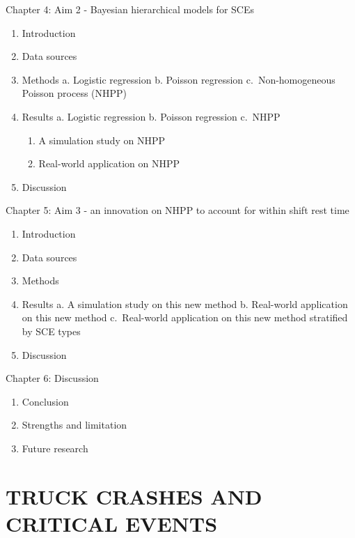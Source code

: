 \documentclass[12pt]{book}
\numberwithin{equation}{chapter}
\providecommand{\tightlist}{%
  \setlength{\itemsep}{0pt}\setlength{\parskip}{0pt}}
\begin{document}
Chapter 4: Aim 2 - Bayesian hierarchical models for SCEs

\begin{enumerate}
\def\labelenumi{\arabic{enumi}.}
\tightlist
\item
  Introduction
\item
  Data sources
\item
  Methods
  a. Logistic regression
  b. Poisson regression
  c.~Non-homogeneous Poisson process (NHPP)
\item
  Results
  a. Logistic regression
  b. Poisson regression
  c.~NHPP

  \begin{enumerate}
  \def\labelenumii{\roman{enumii}.}
  \tightlist
  \item
    A simulation study on NHPP
  \item
    Real-world application on NHPP
  \end{enumerate}
\item
  Discussion
\end{enumerate}

Chapter 5: Aim 3 - an innovation on NHPP to account for within shift rest time

\begin{enumerate}
\def\labelenumi{\arabic{enumi}.}
\tightlist
\item
  Introduction
\item
  Data sources
\item
  Methods
\item
  Results
  a. A simulation study on this new method
  b. Real-world application on this new method
  c.~Real-world application on this new method stratified by SCE types
\item
  Discussion
\end{enumerate}

Chapter 6: Discussion

\begin{enumerate}
\def\labelenumi{\arabic{enumi}.}
\tightlist
\item
  Conclusion
\item
  Strengths and limitation
\item
  Future research
\end{enumerate}

\hypertarget{truck-crashes-and-critical-events}{%
\chapter{TRUCK CRASHES AND CRITICAL EVENTS}\label{truck-crashes-and-critical-events}}
\end{document}
